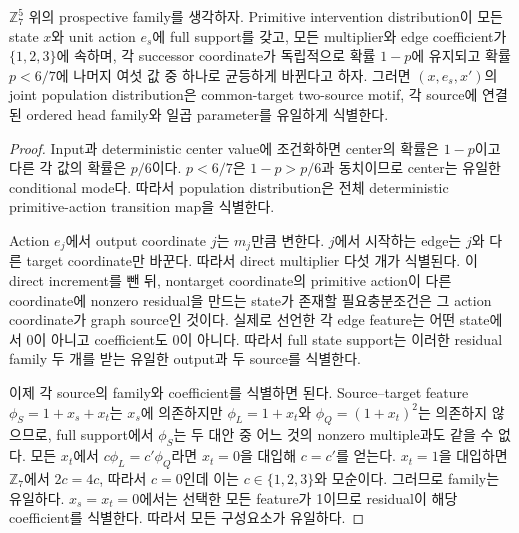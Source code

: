 \begin{proposition}
\label{prop:motif-identifiability}
\(\mathbb Z_7^5\) 위의 prospective family를 생각하자. Primitive intervention
distribution이 모든 state \(x\)와 unit action \(e_s\)에 full support를 갖고, 모든
multiplier와 edge coefficient가 \(\{1,2,3\}\)에 속하며, 각 successor coordinate가
독립적으로 확률 \(1-p\)에 유지되고 확률 \(p<6/7\)에 나머지 여섯 값 중 하나로
균등하게 바뀐다고 하자. 그러면 \((x,e_s,x')\)의 joint population distribution은
common-target two-source motif, 각 source에 연결된 ordered head family와 일곱
parameter를 유일하게 식별한다.
\end{proposition}
\begin{proof}
Input과 deterministic center value에 조건화하면 center의 확률은 \(1-p\)이고 다른
각 값의 확률은 \(p/6\)이다. \(p<6/7\)은 \(1-p>p/6\)과 동치이므로 center는 유일한
conditional mode다. 따라서 population distribution은 전체 deterministic
primitive-action transition map을 식별한다.

Action \(e_j\)에서 output coordinate \(j\)는 \(m_j\)만큼 변한다. \(j\)에서 시작하는
edge는 \(j\)와 다른 target coordinate만 바꾼다. 따라서 direct multiplier 다섯 개가
식별된다. 이 direct increment를 뺀 뒤, nontarget coordinate의 primitive action이
다른 coordinate에 nonzero residual을 만드는 state가 존재할 필요충분조건은 그 action
coordinate가 graph source인 것이다. 실제로 선언한 각 edge feature는 어떤 state에서
0이 아니고 coefficient도 0이 아니다. 따라서 full state support는 이러한 residual
family 두 개를 받는 유일한 output과 두 source를 식별한다.

이제 각 source의 family와 coefficient를 식별하면 된다. Source--target feature
\(\phi_S=1+x_s+x_t\)는 \(x_s\)에 의존하지만
\(\phi_L=1+x_t\)와 \(\phi_Q=(1+x_t)^2\)는 의존하지 않으므로, full support에서
\(\phi_S\)는 두 대안 중 어느 것의 nonzero multiple과도 같을 수 없다. 모든
\(x_t\)에서 \(c\phi_L=c'\phi_Q\)라면 \(x_t=0\)을 대입해 \(c=c'\)를 얻는다.
\(x_t=1\)을 대입하면 \(\mathbb Z_7\)에서 \(2c=4c\), 따라서 \(c=0\)인데 이는
\(c\in\{1,2,3\}\)와 모순이다. 그러므로 family는 유일하다. \(x_s=x_t=0\)에서는
선택한 모든 feature가 1이므로 residual이 해당 coefficient를 식별한다. 따라서 모든
구성요소가 유일하다.
\end{proof}

